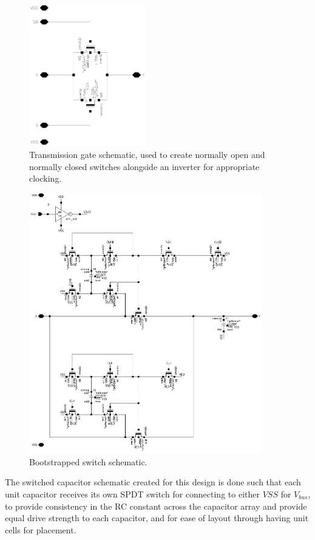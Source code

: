 \documentclass[11pt,letterpaper]{article}
\begin{document}
\begin{figure}[htbp!]
		\centering
		\includegraphics[width=2in]{images/sch_tg.eps}
		\caption{Transmission gate schematic, used to create normally open and normally closed switches alongside an inverter for appropriate clocking.}\label{fig:tg}
\end{figure}

\begin{figure}[htbp!]
		\centering
		\includegraphics[width=4in]{images/sch_bootsw.eps}
		\caption{Bootstrapped switch schematic.}\label{fig:boot}
\end{figure}

The switched capacitor schematic created for this design is done such that each unit capacitor receives its own SPDT switch for connecting to either \(VSS\) for \(V_{bus}\), to provide consistency in the RC constant across the capacitor array and provide equal drive strength to each capacitor, and for ease of layout through having unit cells for placement.
\end{document}
